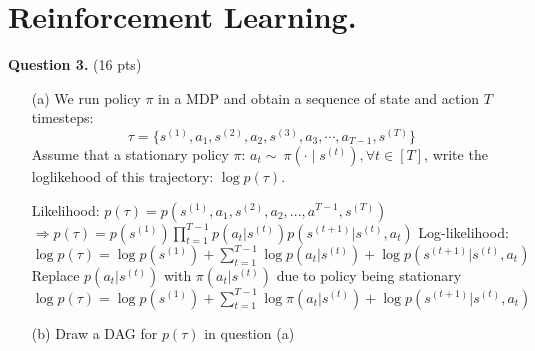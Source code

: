 \documentclass[11pt]{article}
\begin{document}
\section*{Reinforcement Learning.}
\textbf{Question 3.} (16 pts)
\begin{enumerate}
\item[(a)] We run policy $\pi$ in a MDP and obtain a sequence of state and action $T$ timesteps:
\[\tau=\{s^{(1)}, a_1, s^{(2)}, a_2, s^{(3)}, a_3,\cdots, a_{T-1}, s^{(T)}\}\]
Assume that a stationary policy $\pi$: $a_t \sim ~\pi(\cdot \mid s^{(t)}), \forall t\in[T]$, write the loglikehood of this trajectory:  $\log p(\tau)$.

\begin{answertext}{3cm}{}

Likelihood: $p(\tau)=p(s^{(1)},a_1,s^{(2)},a_2,...,a^{T-1},s^{(T)})$\\
$\Longrightarrow p(\tau)=p(s^{(1)})\prod_{t=1}^{T-1}p(a_t|s^{(t)})p(s^{(t+1)}|s^{(t)},a_t)$
Log-likelihood: $\log p(\tau)=\log p(s^{(1)})+\sum_{t=1}^{T-1}\log p(a_t|s^{(t)})+\log p(s^{(t+1)}|s^{(t)},a_t)$\\
Replace $p(a_t | s^{(t)})$ with $\pi(a_t | s^{(t)})$ due to policy being stationary\\
$\log p(\tau)=\log p(s^{(1)})+\sum_{t=1}^{T-1}\log \pi(a_t|s^{(t)})+\log p(s^{(t+1)}|s^{(t)},a_t)$
\end{answertext}

\item [(b)] Draw a DAG for $p(\tau)$ in question (a)

\begin{answertext}{3cm}{}

\end{answertext}
\end{enumerate}
\end{document}
